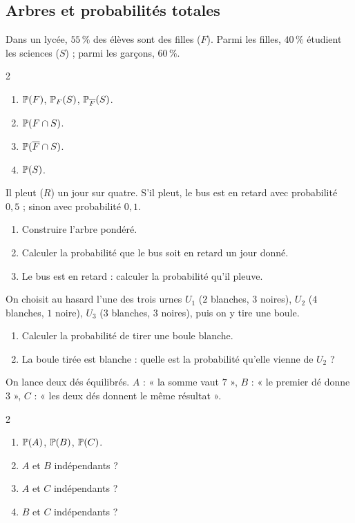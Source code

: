 \subsection{Arbres et probabilités totales}

Dans un lycée, $55\,\%$ des élèves sont des filles ($F$). Parmi les filles,
$40\,\%$ étudient les sciences ($S$) ; parmi les garçons, $60\,\%$.
\begin{multicols}{2}
\begin{enumerate}
	\item $\mathbb{P}(F)$, $\mathbb{P}_F(S)$, $\mathbb{P}_{\overline{F}}(S)$.
	\item $\mathbb{P}(F\cap S)$.
	\item $\mathbb{P}(\overline{F}\cap S)$.
	\item $\mathbb{P}(S)$.
\end{enumerate}
\end{multicols}

Il pleut ($R$) un jour sur quatre. S'il pleut, le bus est en retard avec
probabilité $0{,}5$ ; sinon avec probabilité $0{,}1$.
\begin{enumerate}
	\item Construire l'arbre pondéré.
	\item Calculer la probabilité que le bus soit en retard un jour donné.
	\item Le bus est en retard : calculer la probabilité qu'il pleuve.
\end{enumerate}

On choisit au hasard l'une des trois urnes $U_1$ ($2$ blanches, $3$ noires),
$U_2$ ($4$ blanches, $1$ noire), $U_3$ ($3$ blanches, $3$ noires), puis on y
tire une boule.
\begin{enumerate}
	\item Calculer la probabilité de tirer une boule blanche.
	\item La boule tirée est blanche : quelle est la probabilité qu'elle
	vienne de $U_2$ ?
\end{enumerate}

On lance deux dés équilibrés. $A$ : « la somme vaut $7$ », $B$ : « le premier
dé donne $3$ », $C$ : « les deux dés donnent le même résultat ».
\begin{multicols}{2}
\begin{enumerate}
	\item $\mathbb{P}(A)$, $\mathbb{P}(B)$, $\mathbb{P}(C)$.
	\item $A$ et $B$ indépendants ?
	\item $A$ et $C$ indépendants ?
	\item $B$ et $C$ indépendants ?
\end{enumerate}
\end{multicols}

